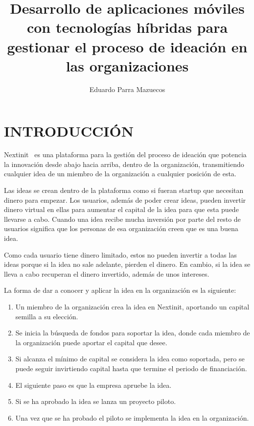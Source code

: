 \documentclass{pre-tfg}
\title{Desarrollo de aplicaciones móviles con tecnologías híbridas para gestionar el proceso de ideación en las organizaciones}
\author{Eduardo Parra Mazuecos}
\begin{document}
    \maketitle
    \tableofcontents

    \newpage

    \section{INTRODUCCIÓN}

    Nextinit~\cite{NEXT} es una plataforma para la gestión del proceso de ideación que potencia la innovación desde
    abajo hacia arriba, dentro de la organización, transmitiendo cualquier idea de un miembro de la organización a
    cualquier posición de esta.

    Las ideas se crean dentro de la plataforma como si fueran startup que necesitan dinero para empezar. Los usuarios,
    además de poder crear ideas, pueden invertir dinero virtual en ellas para aumentar el capital de la idea para que
    esta puede llevarse a cabo. Cuando una idea recibe mucha inversión por parte del resto de usuarios significa que 
    los personas de esa organización creen que es una buena idea.
    
    Como cada usuario tiene dinero limitado, estos no pueden invertir a todas las ideas porque si la idea no sale adelante,
    pierden el dinero. En cambio, si la idea se lleva a cabo recuperan el dinero invertido, además de unos intereses.

    La forma de dar a conocer y aplicar la idea en la organización es la siguiente:
    \begin{enumerate}
        \item Un miembro de la organización crea la idea en Nextinit, aportando un capital semilla a su elección.
        \item Se inicia la búsqueda de fondos para soportar la idea, donde cada miembro de la organización puede
        aportar el capital que desee.
        \item Si alcanza el mínimo de capital se considera la idea como soportada, pero se puede seguir invirtiendo
        capital hasta que termine el periodo de financiación.
        \item El siguiente paso es que la empresa apruebe la idea.
        \item Si se ha aprobado la idea se lanza un proyecto piloto.
        \item Una vez que se ha probado el piloto se implementa la idea en la organización.
    \end{enumerate}
\end{document}
